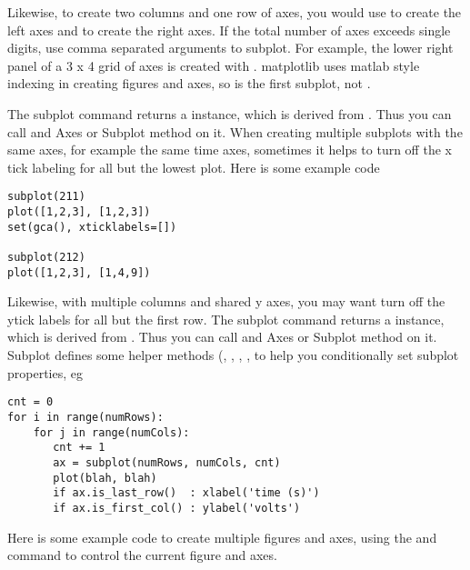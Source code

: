 \documentclass[twoside]{book}
\begin{document}




\noindent Likewise, to create two columns and one row of axes, you would use
 to create the left axes and  to
create the right axes.  If the total number of axes exceeds single
digits, use comma separated arguments to subplot.  For example, the
lower right panel of a 3 x 4 grid of axes is created with
.  matplotlib uses matlab style indexing in
creating figures and axes, so  is the first
subplot, not .


The subplot command returns a 
instance, which is derived from .  Thus
you can call and Axes or Subplot method on it.  When creating multiple
subplots with the same axes, for example the same time axes, sometimes
it helps to turn off the x tick labeling for all but the lowest plot.
Here is some example code

\begin{lstlisting}
subplot(211)
plot([1,2,3], [1,2,3])
set(gca(), xticklabels=[])

subplot(212)
plot([1,2,3], [1,4,9])
\end{lstlisting}


Likewise, with multiple columns and shared y axes, you may want turn
off the ytick labels for all but the first row.  The subplot command
returns a  instance, which is derived
from .  Thus you can call and Axes or
Subplot method on it.  Subplot defines some helper methods
(, , ,
, to help you conditionally set subplot properties,
eg

\begin{lstlisting}
cnt = 0
for i in range(numRows):
    for j in range(numCols):
       cnt += 1
       ax = subplot(numRows, numCols, cnt)
       plot(blah, blah)
       if ax.is_last_row()  : xlabel('time (s)')
       if ax.is_first_col() : ylabel('volts')
\end{lstlisting}


Here is some example code to create multiple figures and axes, using
the  and  command to control the current
figure and axes.
\end{document}
